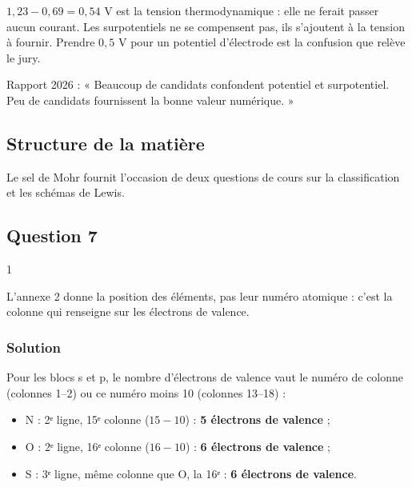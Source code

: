\documentclass[11pt,a4paper]{article}
\providecommand{\tightlist}{\setlength{\itemsep}{0pt}\setlength{\parskip}{0pt}}
\begin{document}
\begin{piege}

\(1{,}23-0{,}69=0{,}54\) V est la tension thermodynamique : elle ne ferait passer aucun courant. Les surpotentiels ne se compensent pas, ils s'ajoutent à la tension à fournir. Prendre \(0{,}5\) V pour un potentiel d'électrode est la confusion que relève le jury.

\end{piege}

\begin{jury}

Rapport 2026 : « Beaucoup de candidats confondent potentiel et surpotentiel. Peu de candidats fournissent la bonne valeur numérique. »

\end{jury}

\hypertarget{structure-de-la-matiuxe8re}{%
\subsection{Structure de la matière}\label{structure-de-la-matiuxe8re}}

Le sel de Mohr fournit l'occasion de deux questions de cours sur la classification et les schémas de Lewis.

\hypertarget{question-7}{%
\subsection{Question 7}\label{question-7}}

\begin{indication}{1}

L'annexe 2 donne la position des éléments, pas leur numéro atomique : c'est la colonne qui renseigne sur les électrons de valence.

\end{indication}

\hypertarget{solution-6}{%
\subsubsection{Solution}\label{solution-6}}

Pour les blocs s et p, le nombre d'électrons de valence vaut le numéro de colonne (colonnes 1--2) ou ce numéro moins 10 (colonnes 13--18) :

\begin{itemize}
\tightlist
\item
  N : 2ᵉ ligne, 15ᵉ colonne (\(15-10\)) : \textbf{5 électrons de valence} ;
\item
  O : 2ᵉ ligne, 16ᵉ colonne (\(16-10\)) : \textbf{6 électrons de valence} ;
\item
  S : 3ᵉ ligne, même colonne que O, la 16ᵉ : \textbf{6 électrons de valence}.
\end{itemize}
\end{document}
